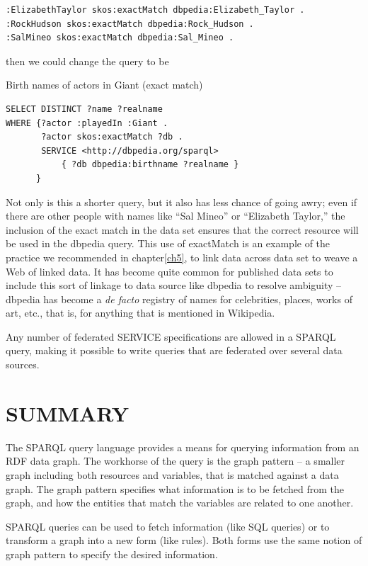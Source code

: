 \begin{lstlisting}
:ElizabethTaylor skos:exactMatch dbpedia:Elizabeth_Taylor .
:RockHudson skos:exactMatch dbpedia:Rock_Hudson .
:SalMineo skos:exactMatch dbpedia:Sal_Mineo .
\end{lstlisting}

then we could change the query to be 

\begin{query}Birth names of actors in Giant (exact match)\end{query}
\begin{lstlisting}
SELECT DISTINCT ?name ?realname
WHERE {?actor :playedIn :Giant .
       ?actor skos:exactMatch ?db .
       SERVICE <http://dbpedia.org/sparql>
           { ?db dbpedia:birthname ?realname }
      }
\end{lstlisting}

Not only is this a shorter query, but it also has less chance of going
awry; even if there are other people with names like ``Sal Mineo'' or
``Elizabeth Taylor,'' the inclusion of the exact match in the data set
ensures that the correct resource will be used in the dbpedia query.
This use of exactMatch is an example of the practice we recommended in
chapter\ref{ch5}, to link data across data set to weave a Web of linked data.
It has become quite common for published data sets to include this sort
of linkage to data source like dbpedia to resolve ambiguity -- dbpedia
has become a \emph{de facto} registry of names for celebrities, places,
works of art, etc., that is, for anything that is mentioned in
Wikipedia.

Any number of federated SERVICE specifications are allowed in a SPARQL
query, making it possible to write queries that are federated over
several data sources.

\section{SUMMARY}

The SPARQL query language provides a means for querying information from
an RDF data graph. The workhorse of the query is the graph pattern -- a
smaller graph including both resources and variables, that is matched
against a data graph. The graph pattern specifies what information is to
be fetched from the graph, and how the entities that match the variables
are related to one another.

SPARQL queries can be used to fetch information (like SQL queries) or to
transform a graph into a new form (like rules). Both forms use the same
notion of graph pattern to specify the desired information.

